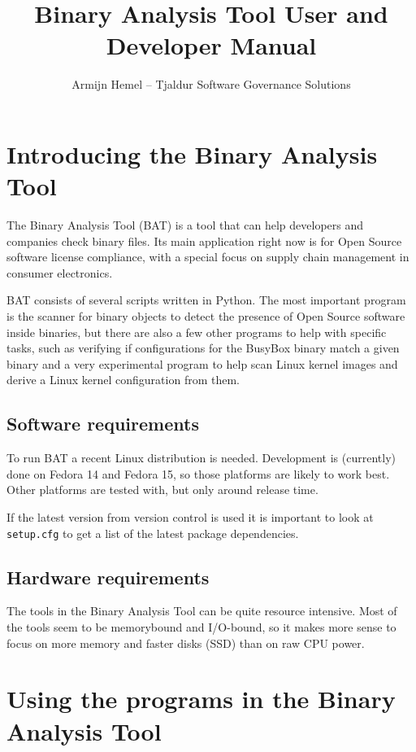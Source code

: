 \documentclass[10pt]{article}
\author{Armijn Hemel -- Tjaldur Software Governance Solutions}
\title{Binary Analysis Tool User and Developer Manual}
\begin{document}
\maketitle
\thispagestyle{empty}

\section{Introducing the Binary Analysis Tool}

The Binary Analysis Tool (BAT) is a tool that can help developers and companies
check binary files. Its main application right now is for Open Source software
license compliance, with a special focus on supply chain management in consumer
electronics.

BAT consists of several scripts written in Python. The most important program
is the scanner for binary objects to detect the presence of Open Source
software inside binaries, but there are also a few other programs to help with
specific tasks, such as verifying if configurations for the BusyBox binary
match a given binary and a very experimental program to help scan Linux kernel
images and derive a Linux kernel configuration from them.

\subsection{Software requirements}

To run BAT a recent Linux distribution is needed. Development is (currently)
done on Fedora 14 and Fedora 15, so those platforms are likely to work best.
Other platforms are tested with, but only around release time.

If the latest version from version control is used it is important to look at
\texttt{setup.cfg} to get a list of the latest package dependencies.

\subsection{Hardware requirements}

The tools in the Binary Analysis Tool can be quite resource intensive. Most of
the tools seem to be memorybound and I/O-bound, so it makes more sense to
focus on more memory and faster disks (SSD) than on raw CPU power.

\section{Using the programs in the Binary Analysis Tool}
\end{document}

